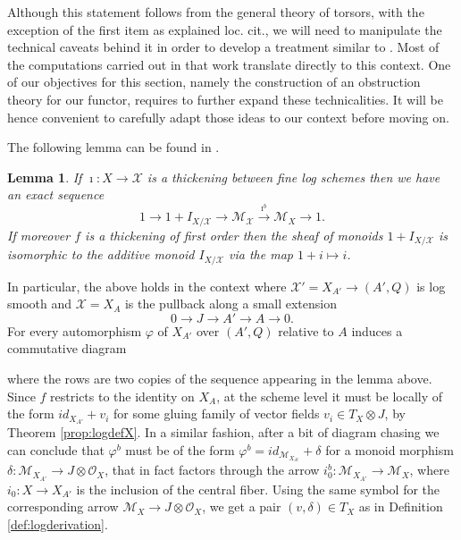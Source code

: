 \documentclass[reqno]{amsart}
\newcommand{\OO}{\mathcal{O}}
\newcommand{\X}{\mathcal{X}}
\newcommand{\M}{\mathcal{M}}
\newcounter{Theorem}
\newtheorem{lemma}[theorem]{Lemma}
\theoremstyle{definition}
\theoremstyle{named}
\begin{document}
  

Although this statement follows from the general theory of torsors, with the exception of the first item as explained loc. cit., we will need to manipulate the technical caveats behind it in order to develop a treatment similar to \cite{gomez1988transverse}. Most of the computations carried out in that work translate directly to this context. One of our objectives for this section, namely the construction of an obstruction theory for our functor, requires to further expand these technicalities. It will be hence convenient to carefully adapt those ideas to our context before moving on.

The following lemma can be found in \cite[Section 3]{abramovich2010logarithmic}.

\begin{lemma}
    If $\imath: X\to \X$ is a thickening between fine log schemes then we have an exact sequence
    $$ 1 \rightarrow 1+I_{X/\X}\rightarrow \M_{\X} \xrightarrow{\imath^b} \M_{X}\rightarrow 1.$$
    If moreover $f$ is a thickening of first order then the sheaf of monoids $1+I_{X/\X}$ is isomorphic to the additive monoid $I_{X/\X}$ via the map $1+i\mapsto i$.
\end{lemma}


In particular, the above holds in the context where $\X'=X_{A'}\to (A',Q)$ is log smooth and $\X=X_A$ is the pullback along a small extension 
$$0\rightarrow J\rightarrow A'\rightarrow A\rightarrow 0.$$
For every automorphism $\varphi$ of $X_{A'}$ over $ (A',Q)$ relative to $A$ induces a commutative diagram
    \begin{center}
    \end{center}
where the rows are two copies of the sequence appearing in the lemma above. Since $f$ restricts to the identity on $X_{A}$, at the scheme level it must be locally of the form $id_{X_{A'}}+v_i$ for some gluing family of vector fields $v_i\in T_X\otimes J$, by Theorem \ref{prop:logdefX}.
In a similar fashion, after a bit of diagram chasing we can conclude that $\varphi^b$ must be of the form $\varphi^b=id_{\M_{X_{A'}}}+\delta$ for a monoid morphism $\delta: \M_{X_{A'}}\to J\otimes\OO_X$, that in fact factors through the arrow $i_0^b:\M_{X_{A'}}\to \M_X$, where $i_0:X\to X_{A'}$ is the inclusion of the central fiber. Using the same symbol for the corresponding arrow $\M_X\to J\otimes \OO_X$, we get a pair $(v,\delta)\in T_X$ as in Definition \ref{def:logderivation}.
\end{document}
